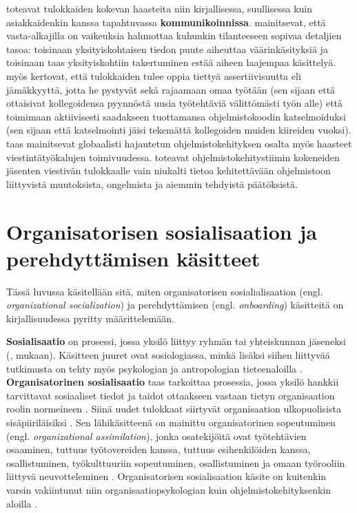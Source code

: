 \documentclass[utf8]{gradu3}
\begin{document}
\textcite{radermacher-ym-2015} toteavat tulokkaiden kokevan haasteita niin kirjallisessa, suullisessa kuin asiakkaidenkin kanssa tapahtuvassa \textbf{kommunikoinnissa}. \textcite{begel-simon-2008} mainitsevat, että vasta-alkajilla on vaikeuksia hahmottaa kuhunkin tilanteeseen sopivaa detaljien tasoa: toisinaan yksityiskohtaisen tiedon puute aiheuttaa väärinkäsityksiä ja toisinaan taas yksityiskohtiin takertuminen estää aiheen laajempaa käsittelyä. \textcite{begel-simon-2008} myös kertovat, että tulokkaiden tulee oppia tiettyä assertiivisuutta eli jämäkkyyttä, jotta he pystyvät sekä rajaamaan omaa työtään (sen sijaan että ottaisivat kollegoidensa pyynnöstä uusia työtehtäviä välittömästi työn alle) että toimimaan aktiivisesti saadakseen tuottamansa ohjelmistokoodin katselmoiduksi (sen sijaan että katselmointi jäisi tekemättä kollegoiden muiden kiireiden vuoksi). \textcite{moe-ym-2020} taas mainitsevat globaalisti hajautetun ohjelmistokehityksen osalta myös haasteet viestintätyökalujen toimivuudessa. \textcite{matturro-ym-2017} toteavat ohjelmistokehitystiimin kokeneiden jäsenten viestivän tulokkaalle vain niukalti tietoa kehitettävään ohjelmistoon liittyvistä muutoksista, ongelmista ja aiemmin tehdyistä päätöksistä.



\section{Organisatorisen sosialisaation ja perehdyttämisen käsitteet}
\label{luku-organisatorinen-sosialisaatio-ja-perehdyttäminen}

Tässä luvussa käsitellään sitä, miten organisatorisen sosialialisaation (engl. \textit{organizational socialization}) ja perehdyttämisen (engl. \textit{onboarding}) käsitteitä on kirjallisuudessa pyritty määrittelemään. 

\textbf{Sosialisaatio} on prosessi, jossa yksilö liittyy ryhmän tai yhteiskunnan jäseneksi (\textcite{brim-1966}, \textcite{chao-2012} mukaan). Käsitteen juuret ovat sosiologiassa, minkä lisäksi siihen liittyvää tutkimusta on tehty myös psykologian ja antropologian tieteenaloilla \parencite{chao-2012}. \textbf{Organisatorinen sosialisaatio} taas tarkoittaa prosessia, jossa yksilö hankkii tarvittavat sosiaaliset tiedot ja taidot ottaakseen vastaan tietyn organisaation roolin normeineen \parencite{van-maanen-schein-1979}. Siinä uudet tulokkaat siirtyvät organisaation ulkopuolisista sisäpiiriläisiksi \parencite{bauer-ym-2007}. Sen lähikäsitteenä on mainittu organisatorinen sopeutuminen (engl. \textit{organizational assimilation}), jonka osatekijöitä ovat työtehtävien osaaminen, tuttuus työtovereiden kanssa, tuttuus esihenkilöiden kanssa, osallistuminen, työkulttuuriin sopeutuminen, osallistuminen ja omaan työrooliin liittyvä neuvotteleminen \parencite{gailliard-ym-2010}. Organisatorisen sosialisaation käsite on kuitenkin varsin vakiintunut niin organisaatiopsykologian kuin ohjelmistokehityksenkin aloilla %
\parencites%
[ks. esim.][]{van-maanen-schein-1979}%
{bauer-2010}%
{bauer-erdogan-2012}%
{saks-gruman-2012}%
{sharma-stol-2019}%
{britto-ym-2017}%
{johnson-senges-2010}%
\relax.
%
\end{document}
